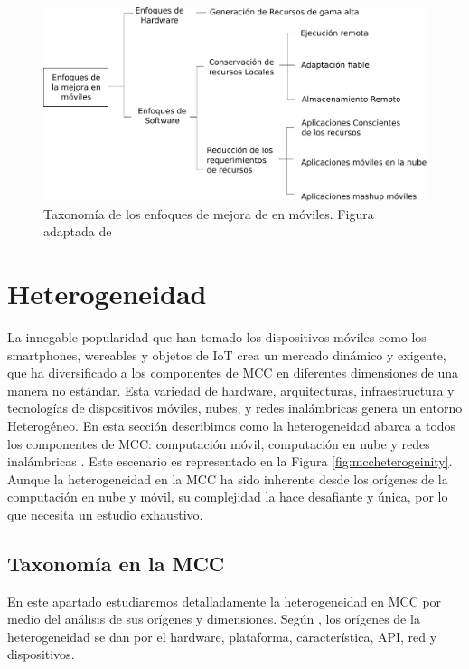 \begin{figure}[h]
 \includegraphics[scale=0.35]{Figures/taxonomySmartphone.pdf}
 \caption{Taxonomía de los enfoques de mejora de en móviles. Figura adaptada de \cite{abolfazli2012mobile}}
 \label{fig:approachesmobileaugmentation}
\end{figure}

\section{Heterogeneidad}

La innegable popularidad que han tomado los dispositivos móviles como los smartphones, wereables y objetos de IoT crea un mercado dinámico
y exigente, que ha diversificado a los componentes de MCC en diferentes dimensiones de una manera no estándar. Esta variedad de hardware, arquitecturas,
infraestructura y tecnologías de dispositivos móviles, nubes, y redes inalámbricas genera un entorno Heterogéneo. En esta sección
describimos como la heterogeneidad abarca a todos los componentes de MCC: computación móvil, computación en nube y redes inalámbricas
\cite{sanaei2014heterogeneity}. Este
escenario es representado en la Figura \ref{fig:mccheterogeinity}. Aunque la heterogeneidad en la MCC ha sido inherente desde los orígenes
de la computación en nube y móvil, su complejidad la hace desafiante y única, por lo que necesita un estudio exhaustivo.


\subsection{Taxonomía en la MCC}

En este apartado estudiaremos detalladamente la heterogeneidad en MCC por medio del análisis de sus orígenes y dimensiones. 
Según \cite{sanaei2014heterogeneity}, 
los orígenes de la heterogeneidad se dan por el hardware, plataforma, característica, API, red y dispositivos. 


